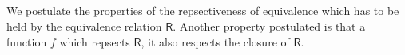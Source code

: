 \begin{code}
\>[12]\<[18]%
\>[18] \AgdaFunction{<}    \AgdaFunction{>}\<%
\\
\>[0]\<[12]%
\>[12]\AgdaSymbol{;}  \AgdaSymbol{=}          \<[48]%
\>[48]\<%
\\
\>[0]\<[20]%
\>[20]            \AgdaSymbol{(}  \AgdaSymbol{))))))}\<%
\\
\>[0]\<[12]%
\>[12]\AgdaSymbol{\}}\<%
\\
\end{code}


We postulate the properties of the repsectiveness of equivalence which has to be held by the equivalence relation $\mathsf{R}$. Another property postulated is that a function $f$ which repsects $\mathsf{R}$, it also respects the closure of $\mathsf{R}$.

